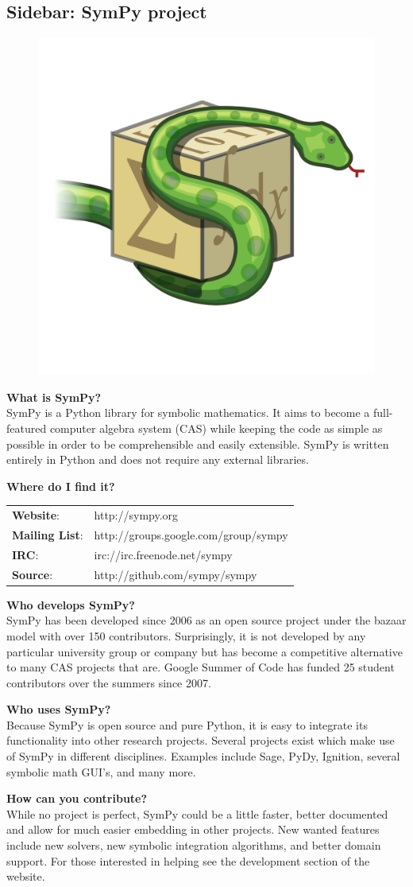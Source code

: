 \subsection{Sidebar: SymPy project}
\begin{figure}[h]
\vspace{-0pt}
\centering
\includegraphics[width=.18\textwidth]{images/logo}
\vspace{-0pt}
\label{fig:}
\vspace{00pt}
\end{figure}

\begin{description}
\item {\bf What is SymPy?}\\
SymPy is a Python library for symbolic mathematics. It aims to become a
full-featured computer algebra system (CAS) while keeping the code as simple as
possible in order to be comprehensible and easily extensible. SymPy is written
entirely in Python and does not require any external libraries.
\item{\bf Where do I find it?}\\
\begin{tabular}{ll}
{\bf Website}: & http://sympy.org \\
{\bf Mailing List}: & http://groups.google.com/group/sympy \\
{\bf IRC}: & irc://irc.freenode.net/sympy \\
{\bf Source}: & http://github.com/sympy/sympy
\end{tabular}
\item {\bf Who develops SymPy?}\\
SymPy has been developed since 2006 as an open source project under the bazaar
model with over 150 contributors.  Surprisingly, it is not developed by any
particular university group or company but has become a competitive alternative
to many CAS projects that are.  Google Summer of Code has funded 25
student contributors over the summers since 2007.
\item{\bf Who uses SymPy?}\\
Because SymPy is open source and pure Python, it is easy to integrate its
functionality into other research projects. Several projects exist which make
use of SymPy in different disciplines. Examples include Sage, PyDy, Ignition,
several symbolic math GUI's, and many more.
\item{\bf How can you contribute?}\\
While no project is perfect, SymPy could be a little faster, better documented
and allow for much easier embedding in other projects.  New wanted features
include new solvers, new symbolic integration algorithms, and better domain
support.  For those interested in helping see the development section of the
website.
\end{description}
